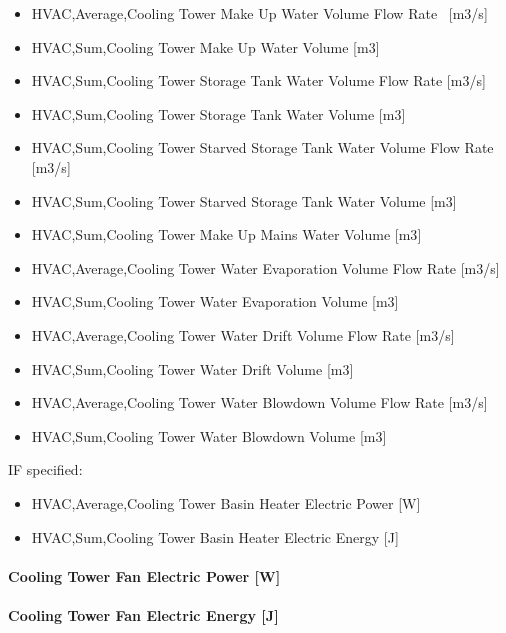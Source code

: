 \begin{itemize}
\item
  HVAC,Average,Cooling Tower Make Up Water Volume Flow Rate~ {[}m3/s{]}
\item
  HVAC,Sum,Cooling Tower Make Up Water Volume {[}m3{]}
\item
  HVAC,Sum,Cooling Tower Storage Tank Water Volume Flow Rate {[}m3/s{]}
\item
  HVAC,Sum,Cooling Tower Storage Tank Water Volume {[}m3{]}
\item
  HVAC,Sum,Cooling Tower Starved Storage Tank Water Volume Flow Rate {[}m3/s{]}
\item
  HVAC,Sum,Cooling Tower Starved Storage Tank Water Volume {[}m3{]}
\item
  HVAC,Sum,Cooling Tower Make Up Mains Water Volume {[}m3{]}
\item
  HVAC,Average,Cooling Tower Water Evaporation Volume Flow Rate {[}m3/s{]}
\item
  HVAC,Sum,Cooling Tower Water Evaporation Volume {[}m3{]}
\item
  HVAC,Average,Cooling Tower Water Drift Volume Flow Rate {[}m3/s{]}
\item
  HVAC,Sum,Cooling Tower Water Drift Volume {[}m3{]}
\item
  HVAC,Average,Cooling Tower Water Blowdown Volume Flow Rate {[}m3/s{]}
\item
  HVAC,Sum,Cooling Tower Water Blowdown Volume {[}m3{]}
\end{itemize}

IF specified:

\begin{itemize}
\item
  HVAC,Average,Cooling Tower Basin Heater Electric Power {[}W{]}
\item
  HVAC,Sum,Cooling Tower Basin Heater Electric Energy {[}J{]}
\end{itemize}

\paragraph{Cooling Tower Fan Electric Power {[}W{]}}\label{cooling-tower-fan-electric-power-w}

\paragraph{Cooling Tower Fan Electric Energy {[}J{]}}\label{cooling-tower-fan-electric-energy-j}

